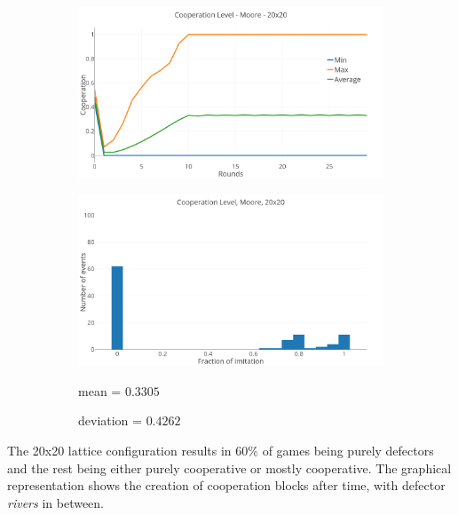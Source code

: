 \documentclass[a4paper, 11pt]{article}
\begin{document}
\begin{figure}[H]
\begin{subfigure}{.75\textwidth}
	\includegraphics[width=1\linewidth]{PDMoore20x20}
\end{subfigure}

\begin{subfigure}{.75\textwidth}
	\includegraphics[width=1\linewidth]{PDMoore20x20HG}
\end{subfigure}%
\begin{subfigure}{.25\textwidth}
	mean = $0.3305$
	
	deviation = $0.4262$
\end{subfigure}

\end{figure}

The 20x20 lattice configuration results in $60 \%$ of games being purely defectors and the rest being either purely cooperative or mostly cooperative. The graphical representation shows the creation of cooperation blocks after time, with defector \textit{rivers} in between. 


\newpage
\end{document}
